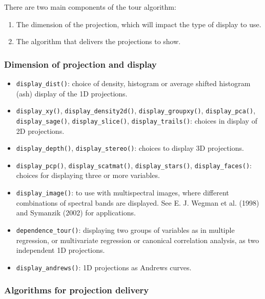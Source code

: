 \documentclass[
  letterpaper,
]{book}
\providecommand{\tightlist}{%
  \setlength{\itemsep}{0pt}\setlength{\parskip}{0pt}}\usepackage{longtable,booktabs,array}
\begin{document}
There are two main components of the tour algorithm:

\begin{enumerate}
\def\labelenumi{\arabic{enumi}.}
\tightlist
\item
  The dimension of the projection, which will impact the type of display
  to use.
\item
  The algorithm that delivers the projections to show.
\end{enumerate}

\hypertarget{dimension-of-projection-and-display}{%
\subsubsection{Dimension of projection and
display}\label{dimension-of-projection-and-display}}

\begin{itemize}
\tightlist
\item
  \texttt{display\_dist()}: choice of density, histogram or average
  shifted histogram (ash) display of the 1D projections.
\item
  \texttt{display\_xy()}, \texttt{display\_density2d()},
  \texttt{display\_groupxy()}, \texttt{display\_pca()},
  \texttt{display\_sage()}, \texttt{display\_slice()},
  \texttt{display\_trails()}: choices in display of 2D projections.
\item
  \texttt{display\_depth()}, \texttt{display\_stereo()}: choices to
  display 3D projections.
\item
  \texttt{display\_pcp()}, \texttt{display\_scatmat()},
  \texttt{display\_stars()}, \texttt{display\_faces()}: choices for
  displaying three or more variables.
\item
  \texttt{display\_image()}: to use with multispectral images, where
  different combinations of spectral bands are displayed. See E. J.
  Wegman et al. (1998) and Symanzik (2002) for applications.
\item
  \texttt{dependence\_tour()}: displaying two groups of variables as in
  multiple regression, or multivariate regression or canonical
  correlation analysis, as two independent 1D projections.
\item
  \texttt{display\_andrews()}: 1D projections as Andrews curves.
\end{itemize}

\hypertarget{algorithms-for-projection-delivery}{%
\subsubsection{Algorithms for projection
delivery}\label{algorithms-for-projection-delivery}}
\end{document}
